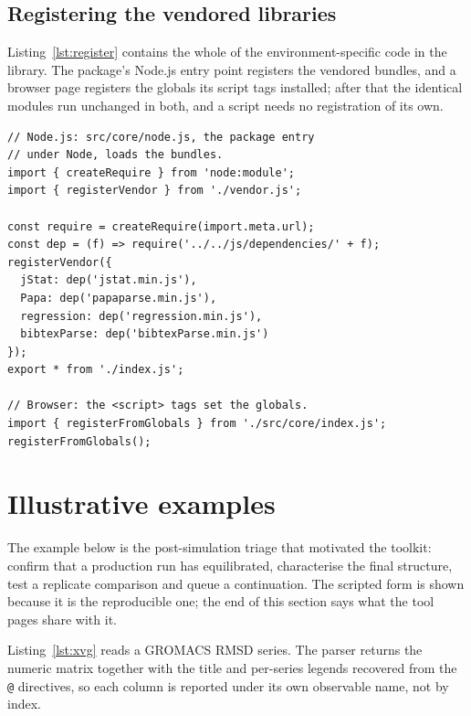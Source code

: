 \documentclass[11pt,a4paper]{article}
\begin{document}
\subsection{Registering the vendored libraries}
\label{sec:snippets}

Listing~\ref{lst:register} contains the whole of the environment-specific code
in the library. The package's Node.js entry point registers the vendored
bundles, and a browser page registers the globals its script tags installed;
after that the identical modules run unchanged in both, and a script needs no
registration of its own.

\begin{lstlisting}[caption={Registration of the vendored libraries by the
Node.js entry point and in the browser.},label={lst:register}]
// Node.js: src/core/node.js, the package entry
// under Node, loads the bundles.
import { createRequire } from 'node:module';
import { registerVendor } from './vendor.js';

const require = createRequire(import.meta.url);
const dep = (f) => require('../../js/dependencies/' + f);
registerVendor({
  jStat: dep('jstat.min.js'),
  Papa: dep('papaparse.min.js'),
  regression: dep('regression.min.js'),
  bibtexParse: dep('bibtexParse.min.js')
});
export * from './index.js';

// Browser: the <script> tags set the globals.
import { registerFromGlobals } from './src/core/index.js';
registerFromGlobals();
\end{lstlisting}

\section{Illustrative examples}
\label{sec:examples}

The example below is the post-simulation triage that motivated the toolkit:
confirm that a production run has equilibrated, characterise the final
structure, test a replicate comparison and queue a continuation. The scripted form
is shown because it is the reproducible one; the end of this section says what
the tool pages share with it.

Listing~\ref{lst:xvg} reads a GROMACS RMSD series. The parser returns the
numeric matrix together with the title and per-series legends recovered from the
\texttt{@} directives, so each column is reported under its own observable name,
not by index.
\end{document}

